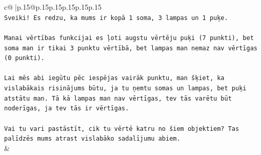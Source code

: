 \documentclass{article}
\begin{document}
{\begin{supertabular}{c@{$\;$}|p{.15\linewidth}@{}p{.15\linewidth}p{.15\linewidth}p{.15\linewidth}p{.15\linewidth}p{.15\linewidth}}
{{{\\ 
\texttt{Sveiki! Es redzu, ka mums ir kopā 1 soma, 3 lampas un 1 puķe.} \\
\\ 
\texttt{Manai vērtības funkcijai es ļoti augstu vērtēju puķi (7 punkti), bet soma man ir tikai 3 punktu vērtībā, bet lampas man nemaz nav vērtīgas (0 punkti).} \\
\\ 
\texttt{Lai mēs abi iegūtu pēc iespējas vairāk punktu, man šķiet, ka vislabākais risinājums būtu, ja tu ņemtu somas un lampas, bet puķi atstātu man. Tā kā lampas man nav vērtīgas, tev tās varētu būt noderīgas, ja tev tās ir vērtīgas.} \\
\\ 
\texttt{Vai tu vari pastāstīt, cik tu vērtē katru no šiem objektiem? Tas palīdzēs mums atrast vislabāko sadalījumu abiem.} \\
            }
        }
    }
    & \\ \\


\end{supertabular}}
\end{document}
